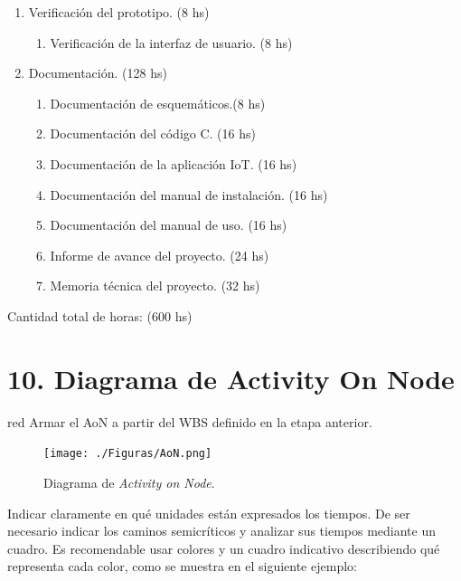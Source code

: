 \documentclass[
11pt, %
]{charter}
\begin{document}
\begin{enumerate}
\item Verificación del prototipo. (8 hs)
	\begin{enumerate}
	\item Verificación de la interfaz de usuario. (8 hs)
	\end{enumerate}	
	
\item Documentación. (128 hs)
	\begin{enumerate}
	\item Documentación de esquemáticos.(8 hs)
	\item Documentación del código C. (16 hs)
	\item Documentación de la aplicación IoT. (16 hs)
	\item Documentación del manual de instalación. (16 hs)
	\item Documentación del manual de uso. (16 hs)
	\item Informe de avance del proyecto. (24 hs)
	\item Memoria técnica del proyecto. (32 hs)

	\end{enumerate}


\end{enumerate}

Cantidad total de horas: (600 hs)



\section{10. Diagrama de Activity On Node}
\label{sec:AoN}

\begin{consigna}{red}
Armar el AoN a partir del WBS definido en la etapa anterior. 



\end{consigna}

\begin{figure}[htpb]
\centering 
\texttt{[image: ./Figuras/AoN.png]}
\caption{Diagrama de \textit{Activity on Node}.}
\label{fig:AoN}
\end{figure}

Indicar claramente en qué unidades están expresados los tiempos.
De ser necesario indicar los caminos semicríticos y analizar sus tiempos mediante un cuadro.
Es recomendable usar colores y un cuadro indicativo describiendo qué representa cada color, como se muestra en el siguiente ejemplo:
\end{document}
